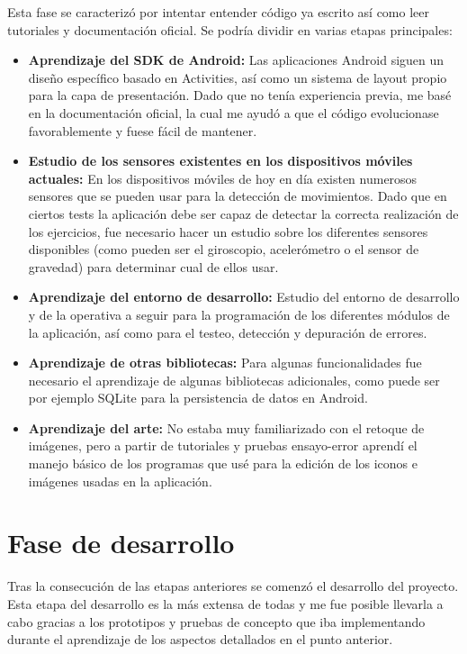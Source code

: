 Esta fase se caracterizó por intentar entender código ya escrito así como leer tutoriales y documentación oficial. Se podría dividir en varias etapas principales:

\begin{itemize}
\item \textbf{Aprendizaje del SDK de Android:} Las aplicaciones Android siguen un diseño específico basado en Activities, así como un sistema de layout propio para la capa de presentación. Dado que no tenía experiencia previa, me basé en la documentación oficial, la cual me ayudó a que el código evolucionase favorablemente y fuese fácil de mantener. 
\item \textbf{Estudio de los sensores existentes en los dispositivos móviles actuales:} En los dispositivos móviles de hoy en día existen numerosos sensores que se pueden usar para la detección de movimientos. Dado que en ciertos tests la aplicación debe ser capaz de detectar la correcta realización de los ejercicios, fue necesario hacer un estudio sobre los diferentes sensores disponibles (como pueden ser el giroscopio, acelerómetro o el sensor de gravedad) para determinar cual de ellos usar.
\item \textbf{Aprendizaje del entorno de desarrollo:} Estudio del entorno de desarrollo y de la operativa a seguir para la programación de los diferentes módulos de la aplicación, así como para el testeo, detección y depuración de errores.
\item \textbf{Aprendizaje de otras bibliotecas:} Para algunas funcionalidades fue necesario el aprendizaje de algunas bibliotecas adicionales, como puede ser por ejemplo SQLite para la persistencia de datos en Android.
\item \textbf{Aprendizaje del arte:} No estaba muy familiarizado con el retoque de imágenes, pero a partir de tutoriales y pruebas ensayo-error aprendí el manejo básico de los programas que usé para la edición de los iconos e imágenes usadas en la aplicación.
\end{itemize}

\section{Fase de desarrollo}

Tras la consecución de las etapas anteriores se comenzó el desarrollo del proyecto. Esta etapa del desarrollo es la más extensa de todas y me fue posible llevarla a cabo gracias a los prototipos y pruebas de concepto que iba implementando durante el aprendizaje de los aspectos detallados en el punto anterior.


